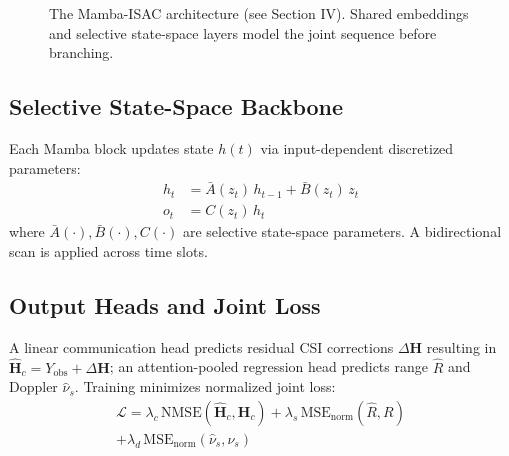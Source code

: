 \documentclass[conference]{IEEEtran}
\begin{document}
\begin{figure}[ht]
\centering
{}
\caption{The Mamba-ISAC architecture (see Section IV). Shared embeddings and selective state-space layers model the joint sequence before branching.}
\label{fig:architecture}
\end{figure}

\subsection{Selective State-Space Backbone}
Each Mamba block updates state $h(t)$ via input-dependent discretized parameters:
\begin{align}
h_t &= \bar{A}(z_t)\, h_{t-1} + \bar{B}(z_t)\, z_t \label{eq:ssm_state}\\
o_t &= C(z_t)\, h_t \label{eq:ssm_output}
\end{align}
where $\bar{A}(\cdot), \bar{B}(\cdot), C(\cdot)$ are selective state-space parameters. A bidirectional scan is applied across time slots.

\subsection{Output Heads and Joint Loss}
A linear communication head predicts residual CSI corrections $\Delta \mathbf{H}$ resulting in $\hat{\mathbf{H}}_c = Y_{\text{obs}} + \Delta \mathbf{H}$; an attention-pooled regression head predicts range $\hat{R}$ and Doppler $\hat{\nu}_s$. Training minimizes normalized joint loss:
\begin{multline}
\mathcal{L} = \lambda_c \, \text{NMSE}(\hat{\mathbf{H}}_c, \mathbf{H}_c) + \lambda_s \, \text{MSE}_{\text{norm}}(\hat{R}, R) \\ + \lambda_d \, \text{MSE}_{\text{norm}}(\hat{\nu}_s, \nu_s)
\label{eq:loss}
\end{multline}
\end{document}

